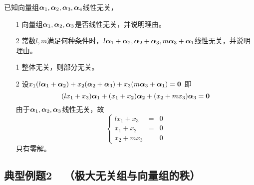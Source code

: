 \begin{frame}\ft{\subsecname}
  
  \begin{li}[2009-2010第一学期]
    已知向量组$\boldsymbol{\alpha}_1,\boldsymbol{\alpha}_2,\boldsymbol{\alpha}_3,\boldsymbol{\alpha}_4$线性无关，
    \begin{itemize}
    \item[1] 向量组$\boldsymbol{\alpha}_1,\boldsymbol{\alpha}_2,\boldsymbol{\alpha}_3$是否线性无关，并说明理由。
    \item[2] 常数$l,m$满足何种条件时，$l\boldsymbol{\alpha}_1+\boldsymbol{\alpha}_2,\boldsymbol{\alpha}_2+\boldsymbol{\alpha}_3,m\boldsymbol{\alpha}_3+\boldsymbol{\alpha}_1$线性无关，并说明理由。
    \end{itemize}
  \end{li}
  \pause \proofname
  \begin{itemize}
  \item[1] 整体无关，则部分无关。
  \item[2]   
    设$
    x_1(l\alphabd_1+\alphabd_2)+x_2(\alphabd_2+\alphabd_3)+x_3(m\alphabd_3+\alphabd_1)=\M0  
    $
    即
    $$
    (lx_1+x_3)\alphabd_1+(x_1+x_2)\alphabd_2 +(x_2+mx_3)\alphabd_3=\M0
    $$      
    由于$\boldsymbol{\alpha}_1,\boldsymbol{\alpha}_2,\boldsymbol{\alpha}_3$线性无关，故
    $$
    \left\{
      \begin{array}{rcl}
        lx_1+x_3&=&0\\
        x_1+x_2&=&0\\
        x_2+mx_3&=&0
      \end{array}
    \right.
    $$
    只有零解。
  \end{itemize}
  
\end{frame}




\subsection{典型例题2~~（极大无关组与向量组的秩）}

